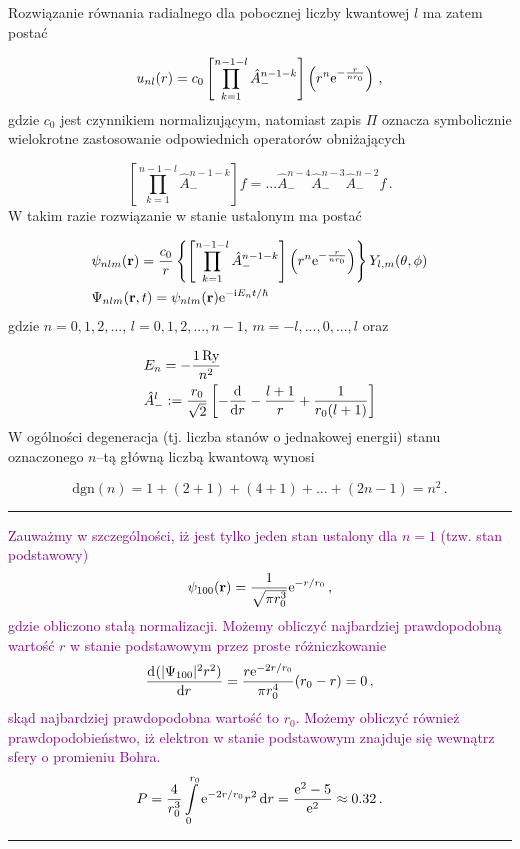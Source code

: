 \documentclass{myclass}
\begin{document}
Rozwiązanie równania radialnego dla pobocznej liczby kwantowej \(l\) ma zatem postać

\begin{equation*}
    u_{nl}(r)=c_0\left[\prod_{k=1}^{n-1-l}\hat{A}_-^{n-1-k}\right]\left(r^n\mathrm{e}^{-\frac{r}{nr_0}}\right)\,,
\end{equation*}
gdzie \(c_0\) jest czynnikiem normalizującym, natomiast zapis \(\Pi\) oznacza symbolicznie
wielokrotne zastosowanie odpowiednich operatorów obniżających

\begin{equation*}
    \left[\prod_{k=1}^{n-1-l}\hat{A}_-^{n-1-k}\right]f=...\hat{A}_-^{n-4}\hat{A}_-^{n-3}\hat{A}_-^{n-2}f\,.
\end{equation*}
W takim razie rozwiązanie w stanie ustalonym ma postać

\begin{equation*}\label{eq:wodoropodobne}
\begin{split}
    &\psi_{nlm}(\mathbf{r})=\frac{c_0}{r}\left\{\left[\prod_{k=1}^{n-1-l}\hat{A}_-^{n-1-k}\right]\left(r^n\mathrm{e}^{-\frac{r}{nr_0}}\right)\right\}Y_{l,m}(\theta,\phi)\\
    &\Psi_{nlm}(\mathbf{r},t)=\psi_{nlm}(\mathbf{r})\mathrm{e}^{-\mathrm{i} E_nt/\hbar}
\end{split}
\end{equation*}
gdzie \(n=0,1,2,...\), \(l=0,1,2,...,n-1\), \(m=-l,...,0,...,l\) oraz

\begin{equation*}
    \begin{split}
    &E_n=-\frac{1\,\text{Ry}}{n^2}\\
    &\hat{A}_-^l:=\frac{r_0}{\sqrt{2}}\left[-\dv[]{}{r}-\frac{l+1}{r}+\frac{1}{r_0(l+1)}\right]
    \end{split}
\end{equation*}
W ogólności degeneracja (tj. liczba stanów o jednakowej energii) stanu oznaczonego \(n\)--tą główną
liczbą kwantową wynosi

\begin{equation*}
    \text{dgn}(n)=1+(2+1)+(4+1)+...+(2n-1)
    =n^2\,.
\end{equation*}
\noindent\rule{\columnwidth}{0.5pt} \textcolor{purple}{Zauważmy w szczególności, iż jest tylko jeden
stan ustalony dla \(n=1\) (tzw. stan podstawowy)
\begin{equation*}
    \psi_{100}(\mathbf{r})=\frac{1}{\sqrt{\pi r_0^3}}\mathrm{e}^{-r/r_0}\,,
\end{equation*}
gdzie obliczono stałą normalizacji. Możemy obliczyć najbardziej prawdopodobną wartość \(r\) w stanie
podstawowym przez proste różniczkowanie
\begin{equation*}
    \dv[]{(|\Psi_{100}|^2r^2)}{r}=\frac{r\mathrm{e}^{-2r/r_0}}{\pi r_0^4}(r_0-r)=0\,,
\end{equation*}
skąd najbardziej prawdopodobna wartość to \(r_0\). Możemy obliczyć również prawdopodobieństwo, iż
elektron w stanie podstawowym znajduje się wewnątrz sfery o promieniu Bohra.
\begin{equation*}
    P=\frac{4}{r_0^3}\int\limits_0^{r_0}\mathrm{e}^{-2r/r_0}r^2\dd{r}=\frac{\mathrm{e}^2-5}{\mathrm{e}^2}\approx0.32\,.
\end{equation*}}
\noindent\rule{\columnwidth}{0.5pt}\\
\end{document}
